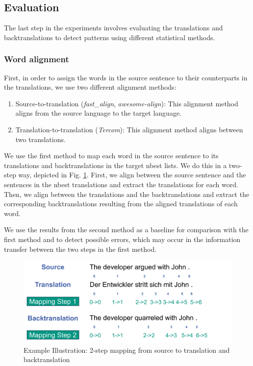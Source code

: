 
\subsection{Evaluation}

The last step in the experiments involves evaluating the translations and backtranslations to detect patterns using different statistical methods.

\subsubsection{Word alignment}
\label{sec:Experiments:Alignment}

First, in order to assign the words in the source sentence to their counterparts in the translations, we use two different alignment methods:

\begin{enumerate}
    \item Source-to-translation (\textit{fast\_align}, \textit{awesome-align}): This alignment method aligns from the source language to the target language.
    \item Translation-to-translation (\textit{Tercom}): This alignment method aligns between two translations.
\end{enumerate}

We use the first method to map each word in the source sentence to its translations and backtranslations in the target nbest lists. We do this in a two-step way, depicted in Fig. \ref{fig:alignment}. First, we align between the source sentence and the sentences in the nbest translations and extract the translations for each word. Then, we align between the translations and the backtranslations and extract the corresponding backtranslations resulting from the aligned translations of each word. 

We use the results from the second method as a baseline for comparison with the first method and to detect possible errors, which may occur in the information transfer between the two steps in the first method.

\begin{figure}
  \centering
  \includegraphics[scale=0.5]{figures/alignment.png}
  \caption{Example Illustration: 2-step mapping from source to translation and backtranslation}
  \label{fig:alignment}
\end{figure}

